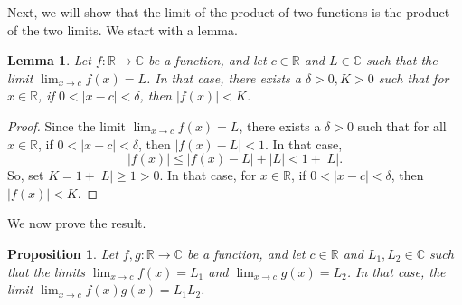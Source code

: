 \documentclass[a4paper, openany]{memoir}
\theoremstyle{definition}
\theoremstyle{plain}
\newtheorem{lemma}[definition]{Lemma}
\newtheorem{proposition}[definition]{Proposition}
\begin{document}
\noindent Next, we will show that the limit of the product of two functions is the product of the two limits. We start with a lemma.
\begin{lemma}
Let $f: \mathbb{R} \to \mathbb{C}$ be a function, and let $c \in \mathbb{R}$ and $L \in \mathbb{C}$ such that the limit $\lim_{x \to c} f(x) = L$. In that case, there exists a $\delta > 0, K > 0$ such that for $x \in \mathbb{R}$, if $0 < |x - c| < \delta$, then $|f(x)| < K$.
\end{lemma}
\begin{proof}
Since the limit $\lim_{x \to c} f(x) = L$, there exists a $\delta > 0$ such that for all $x \in \mathbb{R}$, if $0 < |x - c| < \delta$, then $|f(x) - L| < 1$. In that case, 
\[|f(x)| \leqslant |f(x) - L| + |L| < 1 + |L|.\]
So, set $K = 1 + |L| \geqslant 1 > 0$. In that case, for $x \in \mathbb{R}$, if $0 < |x - c| < \delta$, then $|f(x)| < K$.
\end{proof}
\noindent We now prove the result.
\begin{proposition}
Let $f, g: \mathbb{R} \to \mathbb{C}$ be a function, and let $c \in \mathbb{R}$ and $L_1, L_2 \in \mathbb{C}$ such that the limits $\lim_{x \to c} f(x) = L_1$ and $\lim_{x \to c} g(x) = L_2$. In that case, the limit $\lim_{x \to c} f(x)g(x) = L_1L_2$.
\end{proposition}
\end{document}
